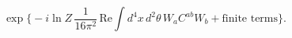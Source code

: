 \begin{equation}
\exp\Bigg\{-i\ln Z\,\frac{1}{16\pi^2}\,
\mbox{Re}\int d^4x\,d^2\theta\,W_a C^{ab} W_b
+\mbox{finite terms}\Bigg\}.
\end{equation}


